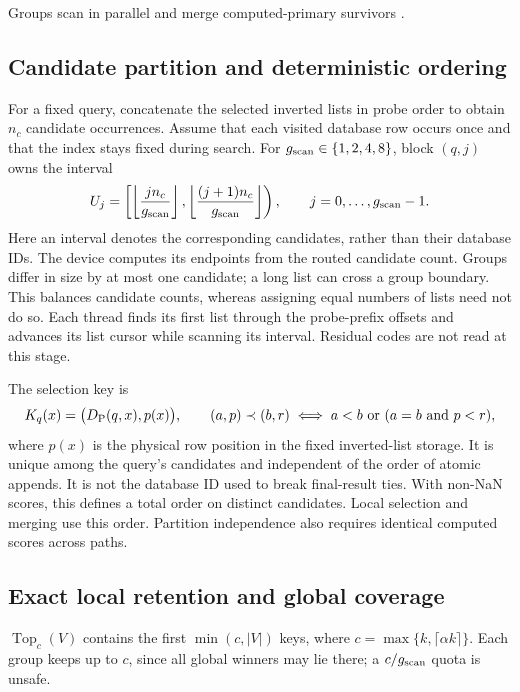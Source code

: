 Groups scan in parallel and merge computed-primary survivors \cite{johnson_gpu}.

\subsection{Candidate partition and deterministic ordering}

For a fixed query, concatenate the selected inverted lists in probe order
to obtain $n_c$ candidate occurrences. Assume that each visited database
row occurs once and that the index stays fixed during search. For
$g_{\mathrm{scan}}\in\{1,2,4,8\}$, block $(q,j)$ owns the interval
\begin{equation}
 U_j=\left[\left\lfloor\frac{j n_c}{g_{\mathrm{scan}}}\right\rfloor,
              \left\lfloor\frac{(j+1)n_c}{g_{\mathrm{scan}}}\right\rfloor\right),
 \qquad j=0,\ldots,g_{\mathrm{scan}}-1.
 \label{eq:5-partition}
\end{equation}
Here an interval denotes the corresponding candidates, rather than their
database IDs. The device computes its endpoints from the routed candidate
count. Groups differ in size by at most one candidate; a long list can
cross a group boundary. This balances candidate counts, whereas assigning
equal numbers of lists need not do so. Each thread finds its first list
through the probe-prefix offsets and advances its list cursor while
scanning its interval. Residual codes are not read at this stage.

The selection key is
\begin{equation}
 K_q(x)=\bigl(D_{\mathrm{P}}(q,x),p(x)\bigr),
 \qquad
 (a,p)\prec(b,r)\iff a<b\ \text{or}\ (a=b\ \text{and}\ p<r),
 \label{eq:5-primary-key}
\end{equation}
where $p(x)$ is the physical row position in the fixed inverted-list
storage. It is unique among the query's candidates and independent of
the order of atomic appends. It is not the database ID used to break
final-result ties. With non-NaN scores, this defines a total order on
distinct candidates. Local selection and merging use this order. Partition independence also requires identical computed scores across paths.

\subsection{Exact local retention and global coverage}

$\operatorname{Top}_c(V)$ contains the first $\min(c,|V|)$ keys, where $c=\max\{k,\lceil\alpha k\rceil\}$. Each group keeps up to $c$, since all global winners may lie there; a $c/g_{\mathrm{scan}}$ quota is unsafe.

